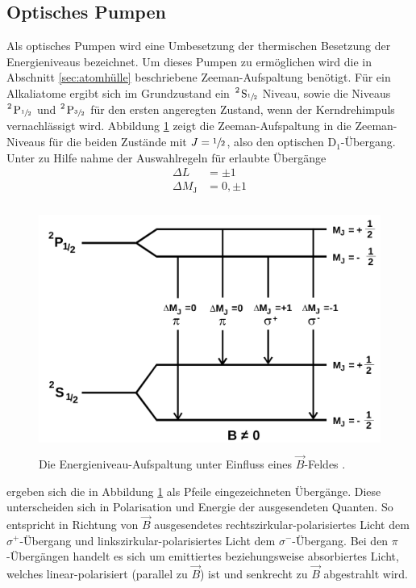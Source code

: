 \subsection{Optisches Pumpen}
\label{sec:pumpen}
Als optisches Pumpen wird eine Umbesetzung der thermischen Besetzung der Energieniveaus bezeichnet.
Um dieses Pumpen zu ermöglichen wird die in Abschnitt \ref{sec:atomhülle} beschriebene Zeeman-Aufspaltung benötigt.
Für ein Alkaliatome ergibt sich im Grundzustand ein $\ce{^2 S_{\sfrac{1}{2}}}$ Niveau, sowie die Niveaus
$\ce{^2 P_{\sfrac{1}{2}}}$ und $\ce{^2 P_{\sfrac{3}{2}}}$ für den ersten angeregten Zustand, wenn der
Kerndrehimpuls vernachlässigt wird. Abbildung \ref{fig:aufspaltung} zeigt die Zeeman-Aufspaltung in die Zeeman-Niveaus für
die beiden Zustände mit $J=\sfrac{1}{2}$, also den optischen $\text{D}_1$-Übergang. Unter zu Hilfe nahme der Auswahlregeln für erlaubte Übergänge
\begin{align*}
  \Delta L & = \pm 1 \\
  \Delta M_\text{J} & = 0, \pm 1
\end{align*}
\begin{figure}
  \centering
  \includegraphics[height=8cm]{content/pictures/Energieniveaus.png}
  \caption{Die Energieniveau-Aufspaltung unter Einfluss eines $\vec{B}$-Feldes \cite{anleitung}.}
  \label{fig:aufspaltung}
\end{figure}
ergeben sich die in Abbildung \ref{fig:aufspaltung} als Pfeile eingezeichneten Übergänge.
Diese unterscheiden sich in Polarisation und Energie der ausgesendeten Quanten. So entspricht 
in Richtung von $\vec{B}$ ausgesendetes rechtszirkular-polarisiertes Licht dem $\sigma^+$-Übergang und 
linkszirkular-polarisiertes Licht dem $\sigma^-$-Übergang. Bei den $\pi$-Übergängen 
handelt es sich um emittiertes beziehungsweise absorbiertes Licht, welches linear-polarisiert
(parallel zu $\vec{B}$) ist und senkrecht zu $\vec{B}$ abgestrahlt wird.

